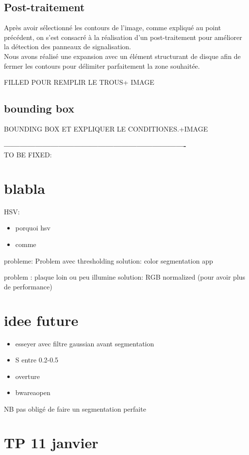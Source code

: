 \documentclass[11pt, french]{article}
\begin{document}
\subsection{Post-traitement }
Après avoir sélectionné les contours de l'image, comme expliqué au point précédent, on s'est consacré à la réalisation d'un post-traitement pour améliorer la détection des panneaux de signalisation.\\
Nous avons réalisé une expansion avec un élément structurant de disque afin de fermer les contours pour délimiter parfaitement la zone souhaitée.

FILLED POUR REMPLIR LE TROUS+ IMAGE

\subsection{ bounding box }

BOUNDING BOX ET EXPLIQUER LE CONDITIONES.+IMAGE


\textbf{----------------------------------------------------------------------}\\

TO BE FIXED: 
\section{blabla}
HSV:
\begin{itemize}
\item porquoi hsv
\item comme
\end{itemize}
probleme: Problem avec thresholding 
solution: color segmentation app

problem : plaque loin ou peu illumine
solution: RGB normalized (pour avoir plus de performance)

\section{idee future}
\begin{itemize}
\item esseyer avec filtre gaussian avant segmentation
\item S entre 0.2-0.5
\item overture
\item bwareaopen
\end{itemize}

NB pas obligé de faire un segmentation perfaite

\section{TP 11 janvier}
\end{document}
